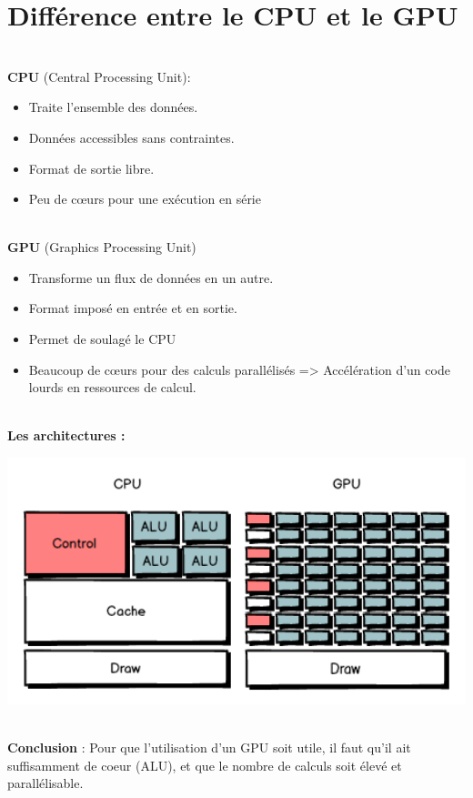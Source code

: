 \section{Différence entre le CPU et le GPU}
\textbf{\\CPU} (Central Processing Unit):
\begin{itemize}
	\item	Traite l'ensemble des données.
	\item	Données accessibles sans contraintes.
	\item	Format de sortie libre.
	\item	Peu de cœurs pour une exécution  en série
\end{itemize}

\textbf{\\GPU} (Graphics Processing Unit)
\begin{itemize}
	\item	Transforme un flux de données en un autre.
	\item	Format imposé en entrée et en sortie.
	\item	Permet de soulagé le CPU
	\item	Beaucoup de cœurs pour des calculs parallélisés => Accélération d’un code lourds en ressources de calcul.
\end{itemize}

\textbf{\\Les architectures :}
\\
\begin{center}
\includegraphics[width=14cm]{pipeline/images/GPUCPU.png}
\end{center}

\textbf{\\Conclusion} : Pour que l’utilisation d’un GPU soit utile, il faut qu'il ait suffisamment de coeur (ALU), et que le nombre de calculs soit élevé et parallélisable.

